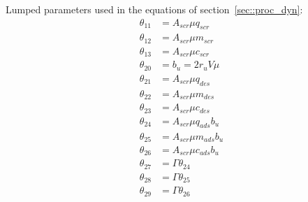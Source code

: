 Lumped parameters used in the equations of section~\ref{sec::proc_dyn}:
\begin{align*}
    \theta_{11} &= A_{scr} \mu q_{scr} \\
    \theta_{12} &= A_{scr} \mu m_{scr} \\
     \theta_{13} &= A_{scr} \mu c_{scr} \\
     \theta_{20} &= b_u = 2 r_u V \mu \\
     \theta_{21} &= A_{scr} \mu q_{des}\\
    \theta_{22} &= A_{scr} \mu m_{des}\\
    \theta_{23} &= A_{scr} \mu c_{des}\\
    \theta_{24} &= A_{scr} \mu q_{ads}b_u\\
    \theta_{25} &= A_{scr} \mu m_{ads}b_u\\
    \theta_{26} &= A_{scr} \mu c_{ads} b_u\\
    \theta_{27} &= \Gamma \theta_{24}\\
    \theta_{28} &= \Gamma \theta_{25}\\
    \theta_{29} &= \Gamma \theta_{26}\\
\end{align*}
